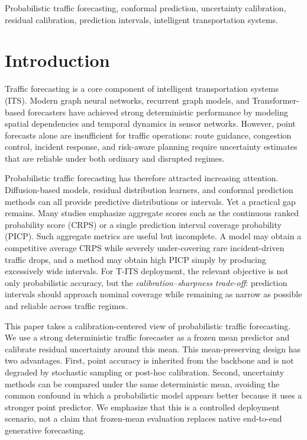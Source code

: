 \documentclass[letterpaper,journal]{IEEEtran}
\begin{document}
\begin{IEEEkeywords}
Probabilistic traffic forecasting, conformal prediction, uncertainty calibration, residual calibration, prediction intervals, intelligent transportation systems.
\end{IEEEkeywords}

\section{Introduction}

Traffic forecasting is a core component of intelligent transportation systems (ITS). Modern graph neural networks, recurrent graph models, and Transformer-based forecasters have achieved strong deterministic performance by modeling spatial dependencies and temporal dynamics in sensor networks. However, point forecasts alone are insufficient for traffic operations: route guidance, congestion control, incident response, and risk-aware planning require uncertainty estimates that are reliable under both ordinary and disrupted regimes.

Probabilistic traffic forecasting has therefore attracted increasing attention. Diffusion-based models, residual distribution learners, and conformal prediction methods can all provide predictive distributions or intervals. Yet a practical gap remains. Many studies emphasize aggregate scores such as the continuous ranked probability score (CRPS) or a single prediction interval coverage probability (PICP). Such aggregate metrics are useful but incomplete. A model may obtain a competitive average CRPS while severely under-covering rare incident-driven traffic drops, and a method may obtain high PICP simply by producing excessively wide intervals. For T-ITS deployment, the relevant objective is not only probabilistic accuracy, but the \emph{calibration--sharpness trade-off}: prediction intervals should approach nominal coverage while remaining as narrow as possible and reliable across traffic regimes.

This paper takes a calibration-centered view of probabilistic traffic forecasting. We use a strong deterministic traffic forecaster as a frozen mean predictor and calibrate residual uncertainty around this mean. This mean-preserving design has two advantages. First, point accuracy is inherited from the backbone and is not degraded by stochastic sampling or post-hoc calibration. Second, uncertainty methods can be compared under the same deterministic mean, avoiding the common confound in which a probabilistic model appears better because it uses a stronger point predictor. We emphasize that this is a controlled deployment scenario, not a claim that frozen-mean evaluation replaces native end-to-end generative forecasting.
\end{document}
